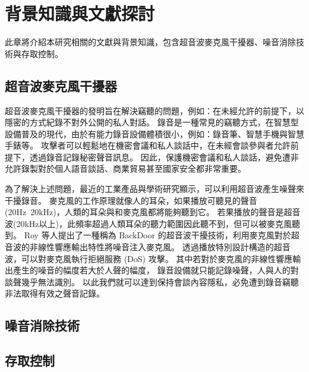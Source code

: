\chapter{背景知識與文獻探討}

    此章將介紹本研究相關的文獻與背景知識，包含超音波麥克風干擾器、噪音消除技術與存取控制。

\section{超音波麥克風干擾器}

    超音波麥克風干擾器的發明旨在解決竊聽的問題，例如：在未經允許的前提下，以隱密的方式紀錄不對外公開的私人對話。
錄音是一種常見的竊聽方式，在智慧型設備普及的現代，由於有能力錄音設備體積很小，例如：錄音筆、智慧手機與智慧手錶等。
攻擊者可以輕鬆地在機密會議和私人談話中，在未經會談參與者允許前提下，透過錄音記錄秘密聲音訊息。
因此，保護機密會議和私人談話，避免遭非允許錄製對於個人語音談話、商業貿易甚至國家安全都非常重要。

    為了解決上述問題，最近的工業產品與學術研究顯示，可以利用超音波產生噪聲來干擾錄音。
麥克風的工作原理就像人的耳朵，如果播放可聽見的聲音(20Hz~20kHz)，人類的耳朵與和麥克風都將能夠聽到它。
若果播放的聲音是超音波(20kHz以上)，此頻率超過人類耳朵的聽力範圍因此聽不到，但可以被麥克風聽到。
Roy 等人提出了一種稱為 BackDoor 的超音波干擾技術，利用麥克風對於超音波的非線性響應輸出特性將噪音注入麥克風。
透過播放特別設計構造的超音波，可以對麥克風執行拒絕服務 (DoS) 攻擊\cite{roy2017backdoor}。
其中若對於麥克風的非線性響應輸出產生的噪音的幅度若大於人聲的幅度，
錄音設備就只能記錄噪聲，人與人的對談聲幾乎無法識別\cite{shen2019jamsys}。
以此我們就可以達到保持會談內容隱私，必免遭到錄音竊聽非法取得有效之聲音記錄。

\section{噪音消除技術}

\section{存取控制}